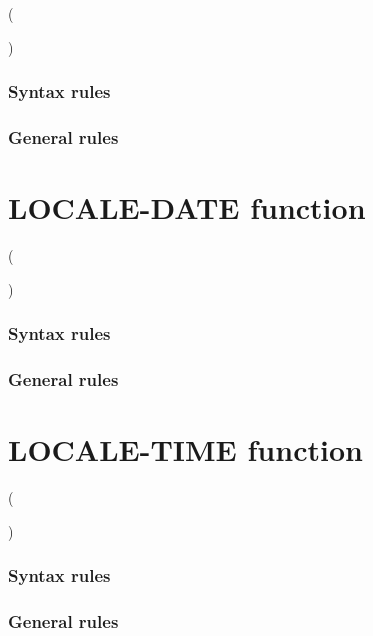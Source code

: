 \begin{syntax}
    ( \argument \argument
  \begin{0-1}
    \argument
  \end{0-1}
  )
\end{syntax}

\subsubsection{Syntax rules}

\subsubsection{General rules}

\section{LOCALE-DATE function}

\begin{syntax}
    ( \argument
  \begin{0-1}
    \argument
  \end{0-1}
  )
\end{syntax}

\subsubsection{Syntax rules}

\subsubsection{General rules}

\section{LOCALE-TIME function}

\begin{syntax}
    ( \argument
  \begin{0-1}
    \argument
  \end{0-1}
  )
\end{syntax}

\subsubsection{Syntax rules}

\subsubsection{General rules}

